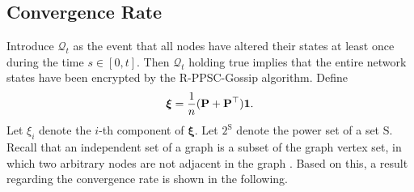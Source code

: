 \documentclass[a4paper, 11pt]{article}
\newcommand{\1}{\mathbf{1}}
\newcommand{\Pb}{\mathbf{P}}
\newcommand{\mU}{\mathrm{U}}
\newcommand{\xib}{\bm{\xi}}
\newcommand*\mcap{\mathbin{\mathpalette\mcapinn\relax}}
\newcommand*\mcapinn[2]{\vcenter{\hbox{$\mathsurround=0pt
			\ifx\displaystyle#1\textstyle\else#1\fi\bigcap$}}}
\newtheorem{lemma}{Lemma}
\begin{document}
\subsection{Convergence Rate}
Introduce $\mathcal{Q}_t$ as the event that all nodes have altered their states at least once during the time $s\in[0,t]$. Then $\mathcal{Q}_t$ holding true implies that the entire network states have been encrypted by the R-PPSC-Gossip  algorithm. Define
\begin{equation}\notag
\xib=\frac{1}{n}(\Pb+\Pb^\top)\1.
\end{equation}
Let $\xi_i$ denote the $i$-th component of $\xib$. Let $2^{\mathrm{S}}$ denote the power set of a set $\mathrm{S}$. Recall that an independent set of a graph is a subset of the graph vertex set, in which two arbitrary nodes are not adjacent in the graph \cite{godsil2013}. Based on this, a result regarding the convergence rate is shown in the following.
\end{document}
